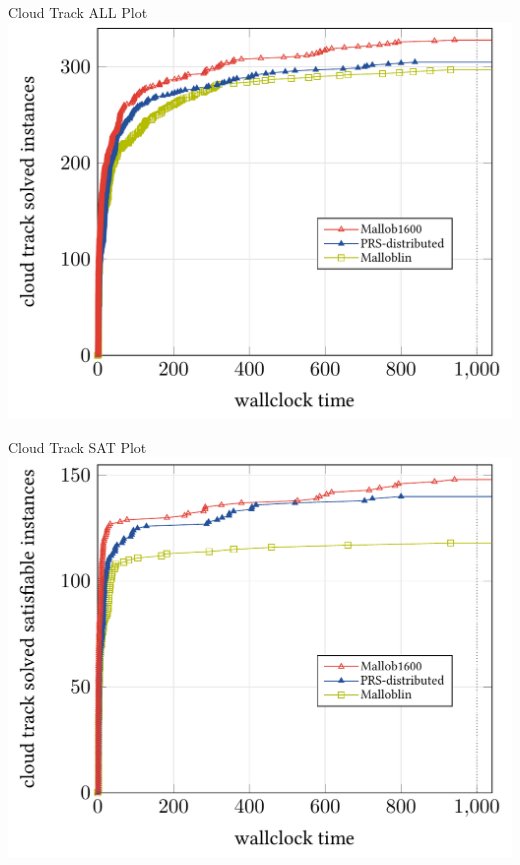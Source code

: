 \documentclass{beamer}
\begin{document}
\begin{frame}{Cloud Track ALL Plot}
\centering
\includegraphics[width=.95\linewidth]{plots/cloud-all-2023.pdf}
\end{frame}

\begin{frame}{Cloud Track SAT Plot}
\centering
\includegraphics[width=.95\linewidth]{plots/cloud-sat-2023.pdf}
\end{frame}
\end{document}
